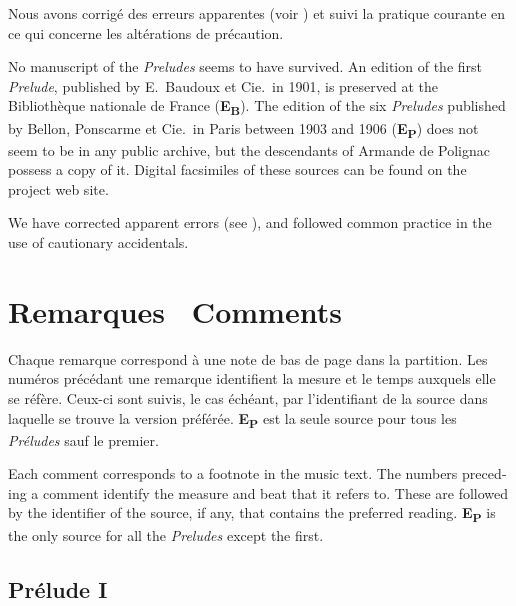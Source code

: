 \documentclass[a4paper, 12pt]{book}
\newcommand{\source}[2]{\textbf{#1\textsubscript{#2}}}
\newcommand{\bigdot}[0]{{\Large \textbullet}}
\newcommand{\centerbigdot}[0]{\begin{center}\bigdot\end{center}}
\begin{document}
  Nous avons corrigé des erreurs apparentes (voir
  ) et suivi la pratique courante en ce qui
  concerne les altérations de précaution.
  
  \centerbigdot
  
  \begin{otherlanguage}{english}
    No manuscript of the \emph{Preludes} seems to have survived. An edition
    of the first \emph{Prelude}, published by E.\ Baudoux et Cie.\ in 1901,
    is preserved at the Bibliothèque nationale de France
    (\source{E}{B}). The edition of the six \emph{Preludes}
    published by Bellon, Ponscarme et Cie.\ in Paris between 1903 and
    1906 (\source{E}{P}) does not seem to be in any public archive,
    but the descendants of Armande de Polignac possess a copy of
    it. Digital facsimiles of these sources can be found on the
    project web site.

    We have corrected apparent errors (see ), and
    followed common practice in the use of cautionary accidentals.
  \end{otherlanguage}
  
  \section*{Remarques \bigdot\ \foreignlanguage{english}{Comments}}
  \label{sec:comments}

    Chaque remarque correspond à une note de bas de page dans la
    partition. Les numéros précédant une remarque identifient la
    mesure et le temps auxquels elle se réfère. Ceux-ci sont suivis,
    le cas échéant, par l'identifiant de la source dans laquelle se
    trouve la version préférée. \source{E}{P} est la seule source pour
    tous les \emph{Préludes} sauf le premier.

    \centerbigdot

    \begin{otherlanguage}{english}
      Each comment corresponds to a footnote in the music text. The
      numbers preceding a comment identify the measure and beat that
      it refers to. These are followed by the identifier of the
      source, if any, that contains the preferred
      reading. \source{E}{P} is the only source for all the \emph{Preludes}
      except the first.
    \end{otherlanguage}
    
    \subsection*{Prélude I}
    
\end{document}
